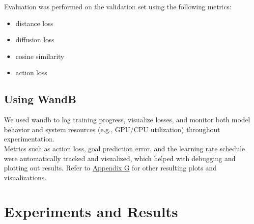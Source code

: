 \documentclass[12pt]{article}
\begin{document}
Evaluation was performed on the validation set using the following metrics:
\begin{itemize}
    \item distance loss
    \item diffusion loss
    \item cosine similarity
    \item action loss
\end{itemize}
\subsection{Using WandB}
We used wandb to log training progress, visualize losses, and monitor both model behavior and system resources (e.g., GPU/CPU utilization)
throughout experimentation. \\
Metrics such as action loss, goal prediction error, and the learning rate schedule were automatically tracked and visualized, which helped with debugging and plotting out results.
Refer to \hyperref[app:wandb]{Appendix G} for other resulting plots and visualizations.\\
\section{Experiments and Results}
\end{document}
